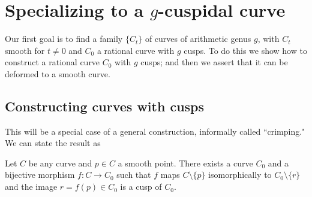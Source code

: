 %
%

\section{Specializing to a $g$-cuspidal curve}

Our first goal is to find a family $\{C_t\}$ of curves of arithmetic genus $g$, with $C_t$ smooth for $t \neq 0$ and $C_0$ a rational curve with $g$ cusps. To do this we show how to construct a rational curve $C_0$ with $g$ cusps; and then we assert that it can be deformed to a smooth curve.

\subsection{Constructing curves with cusps}

This will be a special case of a general construction, informally called ``crimping." We can state the result as

\begin{proposition}
Let $C$ be any curve and $p \in C$ a smooth point. There exists a curve $C_0$ and a bijective morphism $f : C \to C_0$ such that  $f$ maps $C \setminus \{p\}$ isomorphically to $C_0 \setminus \{r\}$ and the image $r=f(p) \in C_0$ is a cusp of $C_0$.
\end{proposition}


